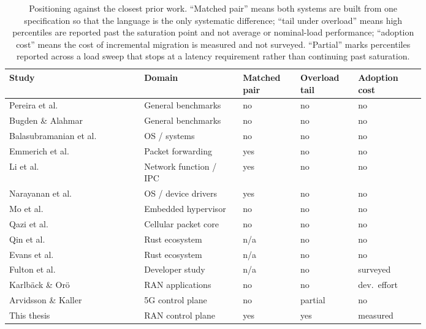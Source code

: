 \documentclass[english,twoside,openright,a4paper,censored,csm,software-track-2020]{HYthesisML}
\begin{document}
\begin{table}
\centering
\small
\caption[Positioning against the closest prior work]{Positioning against the closest prior work. ``Matched pair'' means both systems are
built from one specification so that the language is the only systematic difference; ``tail
under overload'' means high percentiles are reported past the saturation point and not
average or nominal-load performance; ``adoption cost'' means the cost of incremental migration
is measured and not surveyed. ``Partial'' marks percentiles reported across a load sweep
that stops at a latency requirement rather than continuing past
saturation.\label{tab:related}}
\renewcommand{\arraystretch}{1.2}
\small
\begin{tabular}{@{}R{0.26\linewidth} R{0.19\linewidth} R{0.11\linewidth} R{0.10\linewidth} R{0.13\linewidth}@{}}
\hline\hline
Study & Domain & Matched pair & Overload tail & Adoption cost \\
\hline
Pereira et al.~\cite{pereira2017energy}      & General benchmarks  & no  & no  & no  \\
Bugden \& Alahmar~\cite{bugden2022rust}      & General benchmarks  & no  & no  & no  \\
Balasubramanian et al.~\cite{balasubramanian2017rust} & OS / systems & no & no & no \\
Emmerich et al.~\cite{emmerich2019drivers}   & Packet forwarding   & yes & no  & no  \\
Li et al.~\cite{li2021ipc}                   & Network function / IPC & yes & no & no \\
Narayanan et al.~\cite{narayanan2020redleaf} & OS / device drivers & yes & no  & no  \\
Mo et al.~\cite{mo2023rustshyper}            & Embedded hypervisor & no  & no  & no  \\
Qazi et al.~\cite{qazi2017pepc}              & Cellular packet core & no & no  & no  \\
Qin et al.~\cite{qin2020rust}                & Rust ecosystem      & n/a & no  & no  \\
Evans et al.~\cite{evans2020rust}            & Rust ecosystem      & n/a & no  & no  \\
Fulton et al.~\cite{fulton2021adopting}      & Developer study     & n/a & no  & surveyed \\
Karlb\"ack \& Or\"o~\cite{karlback2021ran}   & RAN applications    & no  & no  & dev.\ effort \\
Arvidsson \& Kaller~\cite{arvidsson2025async} & 5G control plane   & no  & partial & no \\
\hline
This thesis & RAN control plane & yes & yes & measured \\
\hline
\end{tabular}
\end{table}
\end{document}
